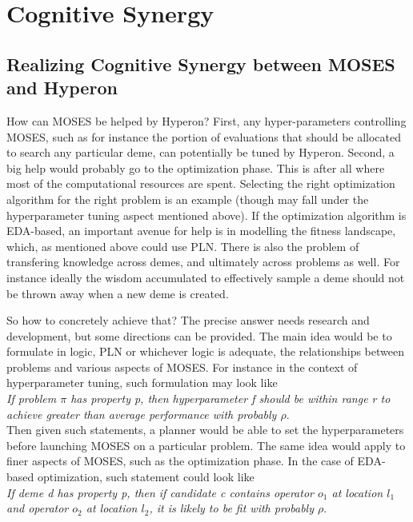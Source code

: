 \documentclass[]{report}
\begin{document}
\chapter{Cognitive Synergy}

\section{Realizing Cognitive Synergy between MOSES and Hyperon}
How can MOSES be helped by Hyperon?  First, any hyper-parameters
controlling MOSES, such as for instance the portion of evaluations
that should be allocated to search any particular deme, can
potentially be tuned by Hyperon.  Second, a big help would probably go
to the optimization phase.  This is after all where most of the
computational resources are spent.  Selecting the right optimization
algorithm for the right problem is an example (though may fall under
the hyperparameter tuning aspect mentioned above).  If the
optimization algorithm is EDA-based, an important avenue for help is
in modelling the fitness landscape, which, as mentioned above could
use PLN.  There is also the problem of transfering knowledge across
demes, and ultimately across problems as well.  For instance ideally
the wisdom accumulated to effectively sample a deme should not be
thrown away when a new deme is created.

So how to concretely achieve that?  The precise answer needs research
and development, but some directions can be provided.  The main idea
would be to formulate in logic, PLN or whichever logic is adequate,
the relationships between problems and various aspects of MOSES.  For
instance in the context of hyperparameter tuning, such formulation may
look like\\

\emph{If problem $\pi$ has property p, then hyperparameter f should be within
range r to achieve greater than average performance with probably
$\rho$}.\\

Then given such statements, a planner would be able to set the
hyperparameters before launching MOSES on a particular problem.  The
same idea would apply to finer aspects of MOSES, such as the
optimization phase.  In the case of EDA-based optimization, such
statement could look like\\

\emph{If deme d has property p, then if candidate c contains operator $o_1$ at
location $l_1$ and operator $o_2$ at location $l_2$, it is likely to
be fit with probably $\rho$}.\\
\end{document}
